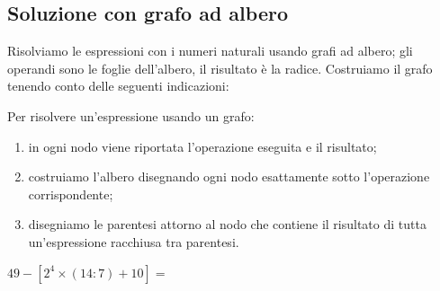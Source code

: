 \subsection{Soluzione con grafo ad albero}

Risolviamo le espressioni con i numeri naturali usando grafi ad albero;
gli operandi sono le foglie dell'albero, il risultato è la radice. 
Costruiamo il grafo tenendo conto delle seguenti indicazioni:

\begin{procedura}{}{}
 Per risolvere un'espressione usando un grafo:
\begin{enumerate} [noitemsep]
 \item in ogni nodo viene riportata l'operazione eseguita e il risultato;
 \item costruiamo l'albero disegnando ogni nodo esattamente sotto
  l'operazione corrispondente;
 \item disegniamo le parentesi attorno al nodo che contiene il
  risultato di tutta un'espressione racchiusa tra parentesi.
\end{enumerate}
\end{procedura}


 \begin{esempio}{}{}
  \(49 - [2^4 \times (14 : 7) + 10]=\)

\end{esempio}


